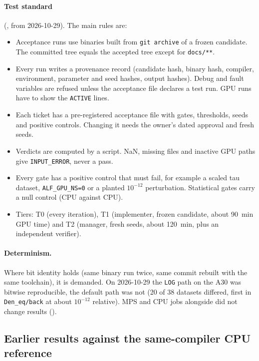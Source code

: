 \paragraph{Test standard} (, from 2026-10-29). The main rules are:
\begin{itemize}
\item Acceptance runs use binaries built from \texttt{git archive} of a frozen candidate. The committed tree equals the accepted tree except for \texttt{docs/**}.
\item Every run writes a provenance record (candidate hash, binary hash, compiler, environment, parameter and seed hashes, output hashes). Debug and fault variables are refused unless the acceptance file declares a test run. GPU runs have to show the \texttt{ACTIVE} lines.
\item Each ticket has a pre-registered acceptance file with gates, thresholds, seeds and positive controls. Changing it needs the owner's dated approval and fresh seeds.
\item Verdicts are computed by a script. NaN, missing files and inactive GPU paths give \texttt{INPUT\_ERROR}, never a pass.
\item Every gate has a positive control that must fail, for example a scaled tau dataset, \texttt{ALF\_GPU\_NS=0} or a planted $10^{-12}$ perturbation. Statistical gates carry a null control (CPU against CPU).
\item Tiers: T0 (every iteration), T1 (implementer, frozen candidate, about 90~min GPU time) and T2 (manager, fresh seeds, about 120~min, plus an independent verifier).
\end{itemize}

\paragraph{Determinism.} Where bit identity holds (same binary run twice, same commit rebuilt with the same toolchain), it is demanded. On 2026-10-29 the \texttt{LOG} path on the A30 was bitwise reproducible, the default path was not (20 of 38 datasets differed, first in \texttt{Den\_eq/back} at about $10^{-12}$ relative). MPS and CPU jobs alongside did not change results (). 

\subsection{Earlier results against the same-compiler CPU reference}

